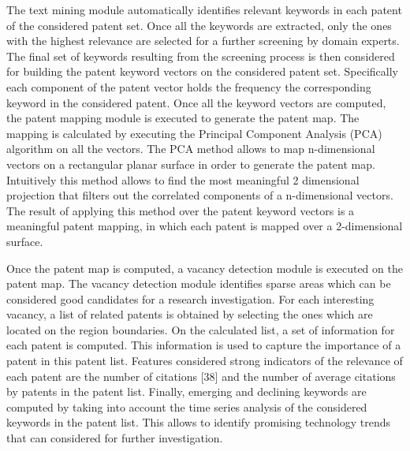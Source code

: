 \documentclass[]{book}
\theoremstyle{definition}
\theoremstyle{definition}
\theoremstyle{definition}
\theoremstyle{remark}
\begin{document}
The text mining module automatically identifies relevant keywords in
each patent of the considered patent set. Once all the keywords are
extracted, only the ones with the highest relevance are selected for a
further screening by domain experts. The final set of keywords resulting
from the screening process is then considered for building the patent
keyword vectors on the considered patent set. Specifically each
component of the patent vector holds the frequency the corresponding
keyword in the considered patent. Once all the keyword vectors are
computed, the patent mapping module is executed to generate the patent
map. The mapping is calculated by executing the Principal Component
Analysis (PCA) algorithm on all the vectors. The PCA method allows to
map n-dimensional vectors on a rectangular planar surface in order to
generate the patent map. Intuitively this method allows to find the most
meaningful 2 dimensional projection that filters out the correlated
components of a n-dimensional vectors. The result of applying this
method over the patent keyword vectors is a meaningful patent mapping,
in which each patent is mapped over a 2-dimensional surface.

Once the patent map is computed, a vacancy detection module is executed
on the patent map. The vacancy detection module identifies sparse areas
which can be considered good candidates for a research investigation.
For each interesting vacancy, a list of related patents is obtained by
selecting the ones which are located on the region boundaries. On the
calculated list, a set of information for each patent is computed. This
information is used to capture the importance of a patent in this patent
list. Features considered strong indicators of the relevance of each
patent are the number of citations {[}38{]} and the number of average
citations by patents in the patent list. Finally, emerging and declining
keywords are computed by taking into account the time series analysis of
the considered keywords in the patent list. This allows to identify
promising technology trends that can considered for further
investigation.
\end{document}
